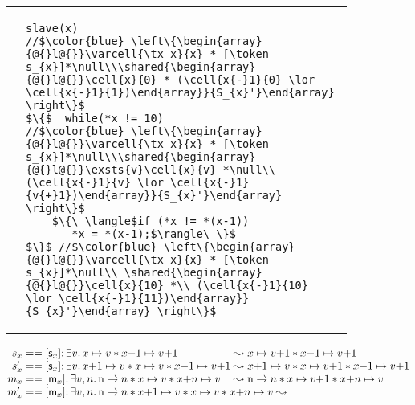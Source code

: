 \begin{figure}
\begin{tabular}{@{} l @{\hspace{8ex}} l@{}}
{\begin{lstlisting}
\end{lstlisting}}
&
\begin{lstlisting}
slave(x)
//$\color{blue} \left\{\begin{array}{@{}l@{}}\varcell{\tx x}{x} * [\token s_{x}]*\null\\\shared{\begin{array}{@{}l@{}}\cell{x}{0} * (\cell{x{-}1}{0} \lor \cell{x{-}1}{1})\end{array}}{S_{x}'}\end{array} \right\}$
$\{$  while(*x != 10)
//$\color{blue} \left\{\begin{array}{@{}l@{}}\varcell{\tx x}{x} * [\token s_{x}]*\null\\\shared{\begin{array}{@{}l@{}}\exsts{v}\cell{x}{v} *\null\\ (\cell{x{-}1}{v} \lor \cell{x{-}1}{v{+}1})\end{array}}{S_{x}'}\end{array} \right\}$
    $\{\ \langle$if (*x != *(x-1))
       *x = *(x-1);$\rangle\ \}$
$\}$ //$\color{blue} \left\{\begin{array}{@{}l@{}}\varcell{\tx x}{x} * [\token s_{x}]*\null\\ \shared{\begin{array}{@{}l@{}}\cell{x}{10} *\\ (\cell{x{-}1}{10} \lor \cell{x{-}1}{11})\end{array}}{S_{x}'}\end{array} \right\}$
\end{lstlisting}
\end{tabular}
\[
\begin{array}{@{}r@{}l@{}l@{}}
  s_x &\null ==
  [\token s_x]{:}\, \exsts{v} \cell{x}{v} * \cell{x{-}1}{v{+}1} &\null\swap
  \cell{x}{v{+}1} * \cell{x{-}1}{v{+}1}
  \\
  s'_x &\null ==
  [\token s_x]{:}\, \exsts{v} \cell{x{+}1}{v} * \cell{x}{v} * \cell{x{-}1}{v{{+}}1} &\null\swap
  \cell{x{+}1}{v} * \cell{x}{v{+}1} * \cell{x{-}1}{v{+}1}\\
  m_{x} &\null ==
  [\token m_{x}]{:}\, \exsts{v,n}\varcell{\tx n}{n} * \cell{x}{v} * \cell{x{+}n}{v} &\null\swap
  \varcell{\tx n}{n} * \cell{x}{v{+}1} * \cell{x{+}n}{v}
  \\
  m'_{x} &
  \multicolumn{2}{@{}l@{}}{%
    \null ==  [\token m_{x}]{:}\, \exsts{v,n}
  \begin{array}[t]{@{}l@{}}
    \varcell{\tx n}{n} * \cell{x{+}1}{v} * \cell{x}{v} * \cell{x{+}n}{v} \swap\null\\

\end{array}}
\end{array}\]
\end{figure}
